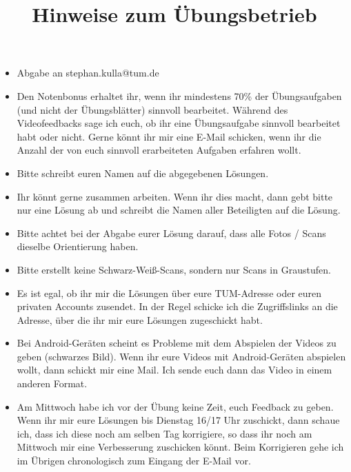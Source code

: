 \documentclass[a4paper]{article}
\title{Hinweise zum Übungsbetrieb}
\date{}
\begin{document}
\maketitle

\begin{itemize}
\item Abgabe an stephan.kulla@tum.de
\item Den Notenbonus erhaltet ihr, wenn ihr mindestens 70\% der Übungsaufgaben (und nicht der Übungsblätter) sinnvoll bearbeitet. Während des Videofeedbacks sage ich euch, ob ihr eine Übungsaufgabe sinnvoll bearbeitet habt oder nicht. Gerne könnt ihr mir eine E-Mail schicken, wenn ihr die Anzahl der von euch sinnvoll erarbeiteten Aufgaben erfahren wollt.
\item Bitte schreibt euren Namen auf die abgegebenen Lösungen.
\item Ihr könnt gerne zusammen arbeiten. Wenn ihr dies macht, dann gebt bitte nur eine Lösung ab und schreibt die Namen aller Beteiligten auf die Lösung.
\item Bitte achtet bei der Abgabe eurer Lösung darauf, dass alle Fotos / Scans dieselbe Orientierung haben.
\item Bitte erstellt keine Schwarz-Weiß-Scans, sondern nur Scans in Graustufen.
\item Es ist egal, ob ihr mir die Lösungen über eure TUM-Adresse oder euren privaten Accounts zusendet. In der Regel schicke ich die Zugriffslinks an die Adresse, über die ihr mir eure Lösungen zugeschickt habt.
\item Bei Android-Geräten scheint es Probleme mit dem Abspielen der Videos zu geben (schwarzes Bild). Wenn ihr eure Videos mit Android-Geräten abspielen wollt, dann schickt mir eine Mail. Ich sende euch dann das Video in einem anderen Format.
\item Am Mittwoch habe ich vor der Übung keine Zeit, euch Feedback zu geben. Wenn ihr mir eure Lösungen bis Dienstag 16/17 Uhr zuschickt, dann schaue ich, dass ich diese noch am selben Tag korrigiere, so dass ihr noch am Mittwoch mir eine Verbesserung zuschicken könnt. Beim Korrigieren gehe ich im Übrigen chronologisch zum Eingang der E-Mail vor.
\end{itemize}
\end{document}
